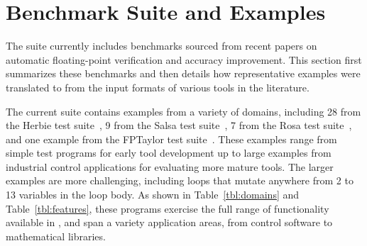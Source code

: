 \documentclass[main.tex]{subfiles}
\begin{document}
\section{Benchmark Suite and Examples}
\label{sec:case-studies}

The \name suite currently includes \nbenches benchmarks
  sourced from recent papers on automatic floating-point
  verification and accuracy improvement.
This section first summarizes these benchmarks
  and then details how representative examples
  were translated to \name from the input formats
  of various tools in the literature.



The current \name suite contains
  examples from a variety of domains, including
  28 from the Herbie test suite~\cite{pavel15},
  9 from the Salsa test suite~\cite{fmics15},
  7 from the Rosa test suite~\cite{DarulovaK14},
  and one example from the FPTaylor test suite~\cite{fptaylor-fm15}.
These examples range from simple test programs for
  early tool development up to
  large examples from industrial control applications for
  evaluating more mature tools.
The larger examples are more challenging,
  including loops that mutate anywhere
  from 2 to 13 variables in the loop body.
As shown in Table~\ref{tbl:domains} and Table~\ref{tbl:features},
  these programs exercise the full range of functionality
  available in \name,
  and span a variety application areas,
  from control software to mathematical libraries.
\end{document}
